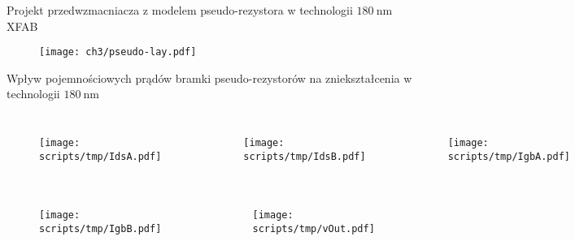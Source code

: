 \begin{frame}{Projekt przedwzmacniacza z modelem pseudo-rezystora w technologii $\SI{180}{\nano\metre}$  XFAB}
    \begin{figure}[H]
        \centering
        \texttt{[image: ch3/pseudo-lay.pdf]} 

    \end{figure}


\end{frame}

\begin{frame}{Wpływ pojemnościowych prądów bramki pseudo-rezystorów na zniekształcenia  w technologii $\SI{180}{\nano\metre}$}
    \vspace{-5mm} %

    \begin{columns}
        \begin{figure}[H]

            \texttt{[image: scripts/tmp/IdsA.pdf]}

        \end{figure}
        \begin{figure}[H]

            \texttt{[image: scripts/tmp/IdsB.pdf]}

        \end{figure}
        \begin{figure}[H]

            \texttt{[image: scripts/tmp/IgbA.pdf]}

        \end{figure}

    \end{columns}
    \vspace{-10mm} %
    \begin{columns}
        \begin{figure}[H]

            \texttt{[image: scripts/tmp/IgbB.pdf]}

        \end{figure}
        \begin{figure}[H]

            \texttt{[image: scripts/tmp/vOut.pdf]}


\end{figure}
\end{columns}
\end{frame}
